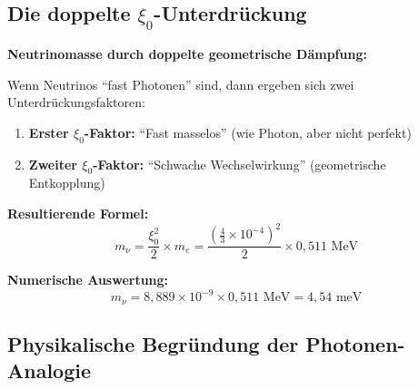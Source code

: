 	\subsection{Die doppelte $\xi_0$-Unterdrückung}
	
	\begin{keyresult}
		\textbf{Neutrinomasse durch doppelte geometrische Dämpfung:}
		
		Wenn Neutrinos ``fast Photonen'' sind, dann ergeben sich zwei Unterdrückungsfaktoren:
		
		\begin{enumerate}
			\item \textbf{Erster $\xi_0$-Faktor:} ``Fast masselos'' (wie Photon, aber nicht perfekt)
			\item \textbf{Zweiter $\xi_0$-Faktor:} ``Schwache Wechselwirkung'' (geometrische Entkopplung)
		\end{enumerate}
		
		\textbf{Resultierende Formel:}
		\begin{equation}
			\boxed{m_\nu = \frac{\xi_0^2}{2} \times m_e = \frac{(\frac{4}{3} \times 10^{-4})^2}{2} \times 0,511 \text{ MeV}}
		\end{equation}
		
		\textbf{Numerische Auswertung:}
		\begin{equation}
			m_\nu = 8,889 \times 10^{-9} \times 0,511 \text{ MeV} = 4,54 \text{ meV}
		\end{equation}
	\end{keyresult}
	
	\subsection{Physikalische Begründung der Photonen-Analogie}
	
